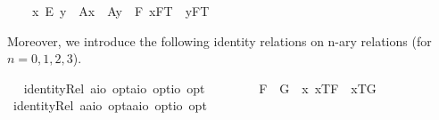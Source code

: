 \begin{isabellebody}
\ \ \ \ x\ \isactrlbold {\isacharequal}\isactrlsub E\ y\ \isactrlbold {\isasymor}\ {\isacharparenleft}{\isasymlparr}A{\isacharbang}{\isacharcomma}x{\isasymrparr}\ \isactrlbold {\isasymand}\ {\isasymlparr}A{\isacharbang}{\isacharcomma}y{\isasymrparr}\ \isactrlbold {\isasymand}\ \isactrlbold {\isasymbox}{\isacharparenleft}\isactrlbold {\isasymforall}F{\isachardot}\ {\isasymlbrace}x{\isacharcomma}F\isactrlsup T{\isasymrbrace}\ \isactrlbold {\isasymequiv}\ {\isasymlbrace}y{\isacharcomma}F\isactrlsup T{\isasymrbrace}{\isacharparenright}{\isacharparenright}{\isachardoublequoteclose}%
\begin{isamarkuptext}%
Moreover, we introduce the following identity relations on n-ary relations (for $n=0,1,2,3$).%
\end{isamarkuptext}\isamarkuptrue%
\ \isamarkupfalse%
\ identityRel{}{\isacharcolon}{\isacharcolon}{\isachardoublequoteopen}\ {\isacharparenleft}{\isacharparenleft}{\isacharprime}a{\isasymRightarrow}io{\isacharparenright}\ opt{\isacharparenright}{\isasymRightarrow}{\isacharparenleft}{\isacharparenleft}{\isacharprime}a{\isasymRightarrow}io{\isacharparenright}\ opt{\isacharparenright}{\isasymRightarrow}io\ opt{\isachardoublequoteclose}\ {\isacharparenleft}\ {\isachardoublequoteopen}\isactrlbold {\isacharequal}\ {}{}{\isacharparenright}\ \isanewline
\ \ \ \ {\isachardoublequoteopen}F{}\ \isactrlbold {\isacharequal}\ G{}\ {\isasymequiv}\ \isactrlbold {\isasymbox}{\isacharparenleft}\isactrlbold {\isasymforall}x{\isachardot}\ {\isasymlbrace}x\isactrlsup T{\isacharcomma}F{}{\isasymrbrace}\ \isactrlbold {\isasymequiv}\ {\isasymlbrace}x\isactrlsup T{\isacharcomma}G{}{\isasymrbrace}{\isacharparenright}{\isachardoublequoteclose}\isanewline
\isanewline
\ \isamarkupfalse%
\ identityRel{}{\isacharcolon}{\isacharcolon}{\isachardoublequoteopen}\ {\isacharparenleft}{\isacharparenleft}{\isacharprime}a{\isasymRightarrow}{\isacharprime}a{\isasymRightarrow}io{\isacharparenright}\ opt{\isacharparenright}{\isasymRightarrow}{\isacharparenleft}{\isacharparenleft}{\isacharprime}a{\isasymRightarrow}{\isacharprime}a{\isasymRightarrow}io{\isacharparenright}\ opt{\isacharparenright}{\isasymRightarrow}io\ opt{\isachardoublequoteclose}\ {\isacharparenleft}\ {\isachardoublequoteopen}\isactrlbold {\isacharequal}\ {}{}{\isacharparenright}\ \isanewline

\end{isabellebody}
